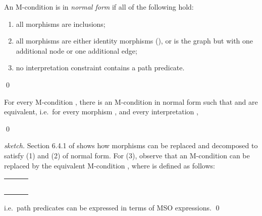 \documentclass{llncs}
\begin{document}
	\begin{definition}\rm
		An M-condition  is in \emph{normal form} if all of the following hold:
		
		\begin{enumerate}
			\item all morphisms are inclusions;
			
			\item all morphisms  are either identity morphisms (), or  is the graph  but with one additional node or one additional edge;
					
			\item no interpretation constraint contains a path predicate.
		\end{enumerate}
		\qed
	\end{definition}
	
	\begin{proposition}\rm
		For every M-condition , there is an M-condition  in normal form such that  and  are equivalent, i.e.\ for every morphism , and every interpretation ,
		
		\qed
	\end{proposition}
	
	\begin{proof}[sketch]\rm
		Section 6.4.1 of \cite{Poskitt13a} shows how morphisms can be replaced and decomposed to satisfy (1) and (2) of normal form. For (3), observe that an M-condition  can be replaced by the equivalent M-condition , where  is defined as follows:\\
		
		\begin{center}\begin{tabular}{r c l}
			 && \vspace{5pt}\\
			
			&& \vspace{5pt}\hspace{0.5in}\\
			
			&& \vspace{5pt}\hspace{0.25in}\\
			
			&& \vspace{5pt}\hspace{0.5in}\\
			
			&& \vspace{5pt}\hspace{0.25in}
		\end{tabular}\end{center}
		
		\noindent i.e.\ path predicates can be expressed in terms of MSO expressions.
			\qed
	\end{proof}
	
\end{document}
